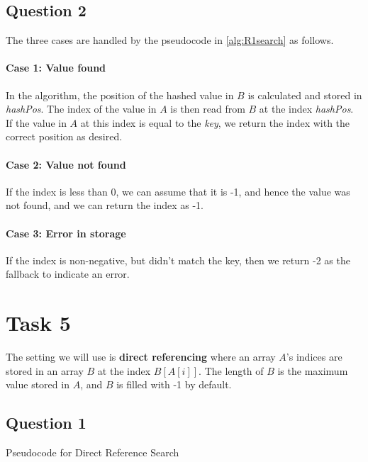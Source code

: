 \subsection{Question 2}
The three cases are handled by the pseudocode in \autoref{alg:R1search} as follows.

\paragraph{Case 1: Value found} In the algorithm, the position of the hashed value in $B$ is calculated and stored in \textit{hashPos}. The index of the value in $A$ is then read from $B$ at the index \textit{hashPos}. If the value in $A$ at this index is equal to the \textit{key}, we return the index with the correct position as desired.

\paragraph{Case 2: Value not found} If the index is less than 0, we can assume that it is -1, and hence the value was not found, and we can return the index as -1.

\paragraph{Case 3: Error in storage} If the index is non-negative, but didn't match the key, then we return -2 as the fallback to indicate an error.

\section{Task 5}

The setting we will use is \textbf{direct referencing} where an array $A$'s indices are stored in an array $B$ at the index $B[A[i]]$. The length of $B$ is the maximum value stored in $A$, and $B$ is filled with -1 by default.


\subsection{Question 1}

\begin{algorithm}[H]
    \caption{Pseudocode for Direct Reference Search}\label{alg:dfsearch}
    \begin{algorithmic}
        \EndIf{}
        \EndFunction{}
    \end{algorithmic}
\end{algorithm}

